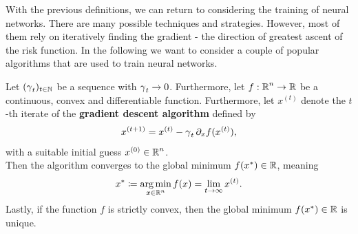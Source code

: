 With the previous definitions, we can return to considering the training of neural networks. There are many possible techniques and strategies. However, most of them rely on iteratively finding the gradient - the direction of greatest ascent of the risk function. In the following we want to consider a couple of popular algorithms that are used to train neural networks.


\begin{theorem}\label{theorem_gd}
Let $(\operatorname{\gamma}_t)_{t \in \operatorname{\mathbb{N}}}$ be a sequence with $\operatorname{\gamma}_t \to 0$. Furthermore, let $f:\operatorname{\mathbb{R}}^n \to \operatorname{\mathbb{R}}$ be a continuous, convex and differentiable function. Furthermore, let $x^{(t)}$ denote the $t$-th iterate of the \textbf{gradient descent algorithm} defined by
\begin{align}
x^{(t+1)} = x^{(t)} - \operatorname{\gamma}_t \partial_x f(x^{(t)}),
\end{align}
with a suitable initial guess $x^{(0)}\in \operatorname{\mathbb{R}}^n$.\\
Then the algorithm converges to the global minimum $f(x^{\ast})\in \operatorname{\mathbb{R}}$, meaning
\begin{align*}
x^{\ast} \coloneqq \operatorname*{arg\,min}_{x\in\operatorname{\mathbb{R}}^n}f(x) = \lim_{t\to\infty} x^{(t)}.
\end{align*}
Lastly, if the function $f$ is strictly convex, then the global minimum $f(x^{\ast}) \in\operatorname{\mathbb{R}}$ is unique.
\end{theorem}


